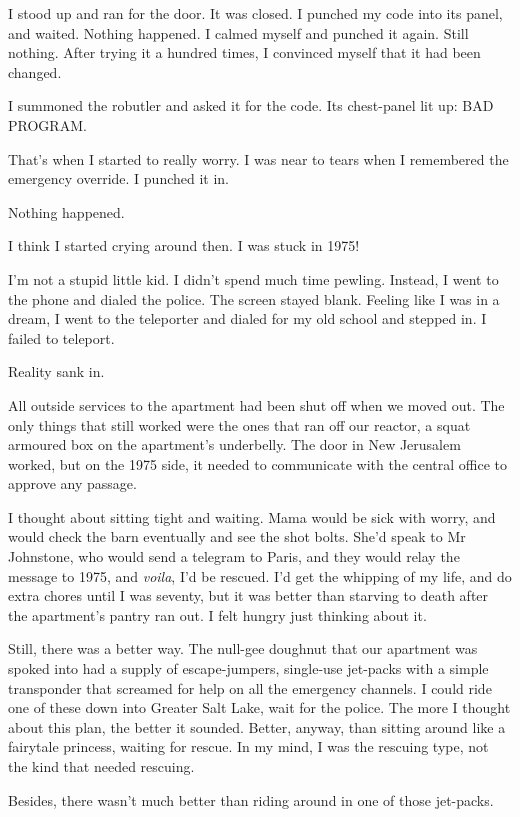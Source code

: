 I stood up and ran for the door. It was closed. I punched my code
into its panel, and waited. Nothing happened. I calmed myself and
punched it again. Still nothing. After trying it a hundred times, I
convinced myself that it had been changed.

I summoned the robutler and asked it for the code. Its chest-panel
lit up: BAD PROGRAM.

That's when I started to really worry. I was near to tears when I
remembered the emergency override. I punched it in.

Nothing happened.

I think I started crying around then. I was stuck in 1975!

\tb

I'm not a stupid little kid. I didn't spend much time pewling.
Instead, I went to the phone and dialed the police. The screen
stayed blank. Feeling like I was in a dream, I went to the
teleporter and dialed for my old school and stepped in. I failed to
teleport.

Reality sank in.

All outside services to the apartment had been shut off when we
moved out. The only things that still worked were the ones that ran
off our reactor, a squat armoured box on the apartment's
underbelly. The door in New Jerusalem worked, but on the 1975 side,
it needed to communicate with the central office to approve any
passage.

I thought about sitting tight and waiting. Mama would be sick with
worry, and would check the barn eventually and see the shot bolts.
She'd speak to Mr Johnstone, who would send a telegram to Paris,
and they would relay the message to 1975, and \emph{voila}, I'd be
rescued. I'd get the whipping of my life, and do extra chores until
I was seventy, but it was better than starving to death after the
apartment's pantry ran out. I felt hungry just thinking about it.

Still, there was a better way. The null-gee doughnut that our
apartment was spoked into had a supply of escape-jumpers,
single-use jet-packs with a simple transponder that screamed for
help on all the emergency channels. I could ride one of these down
into Greater Salt Lake, wait for the police. The more I thought
about this plan, the better it sounded. Better, anyway, than
sitting around like a fairytale princess, waiting for rescue. In my
mind, I was the rescuing type, not the kind that needed rescuing.

Besides, there wasn't much better than riding around in one of
those jet-packs.


